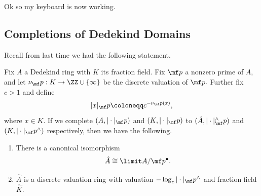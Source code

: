 \documentclass[../notes.tex]{subfiles}
\begin{document}














Ok so my keyboard is now working.

\subsection{Completions of Dedekind Domains}
Recall from last time we had the following statement.
\begin{proposition}
	Fix $A$ a Dedekind ring with $K$ its fraction field. Fix $\mf p$ a nonzero prime of $A,$ and let $\nu_\mf p:K\to\ZZ\cup\{\infty\}$ be the discrete valuation of $\mf p.$ Further fix $c>1$ and define
	\[|x|_\mf p\coloneqq c^{-\nu_\mf p(x)},\]
	where $x\in K.$ If we complete $(A,|\cdot|_\mf p)$ and $(K,|\cdot|_\mf p)$ to $(\hat A,|\cdot|^\wedge_\mf p)$ and $(K,|\cdot|_\mf p^\wedge)$ respectively, then we have the following.
	\begin{enumerate}[label=(\alph*)]
		\item There is a canonical isomorphism
		\[\hat A\cong\limit A/\mf p^\bullet.\]
		\item $\hat A$ is a discrete valuation ring with valuation $-\log_c|\cdot|_\mf p^\wedge$ and fraction field $\hat K.$
	\end{enumerate}
\end{proposition}
\end{document}
